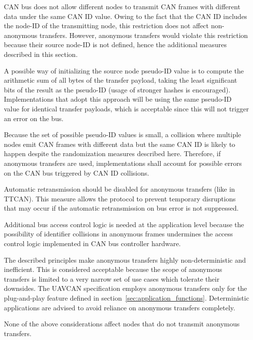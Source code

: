 \begin{remark}[breakable]
    CAN bus does not allow different nodes to transmit CAN frames with different data under the same CAN ID value.
    Owing to the fact that the CAN ID includes the node-ID of the transmitting node,
    this restriction does not affect non-anonymous transfers.
    However, anonymous transfers would violate this restriction because their source node-ID is not defined,
    hence the additional measures described in this section.

    A possible way of initializing the source node pseudo-ID value is to compute the arithmetic sum
    of all bytes of the transfer payload, taking the least significant bits of the result as the pseudo-ID
    (usage of stronger hashes is encouraged).
    Implementations that adopt this approach will be using the same pseudo-ID value for identical transfer payloads,
    which is acceptable since this will not trigger an error on the bus.

    Because the set of possible pseudo-ID values is small,
    a collision where multiple nodes emit CAN frames with different data but the same CAN ID is likely to happen
    despite the randomization measures described here.
    Therefore, if anonymous transfers are used,
    implementations shall account for possible errors on the CAN bus triggered by CAN ID collisions.

    Automatic retransmission should be disabled for anonymous transfers (like in TTCAN).
    This measure allows the protocol to prevent temporary disruptions that may occur if the automatic
    retransmission on bus error is not suppressed.

    Additional bus access control logic is needed at the application level because
    the possibility of identifier collisions in anonymous frames undermines the access control logic implemented
    in CAN bus controller hardware.

    The described principles make anonymous transfers highly non-deterministic and inefficient.
    This is considered acceptable because the scope of anonymous transfers is limited to a very narrow set of use
    cases which tolerate their downsides. The UAVCAN specification employs anonymous transfers only for the
    plug-and-play feature defined in section~\ref{sec:application_functions}.
    Deterministic applications are advised to avoid reliance on anonymous transfers completely.

    None of the above considerations affect nodes that do not transmit anonymous transfers.
\end{remark}

